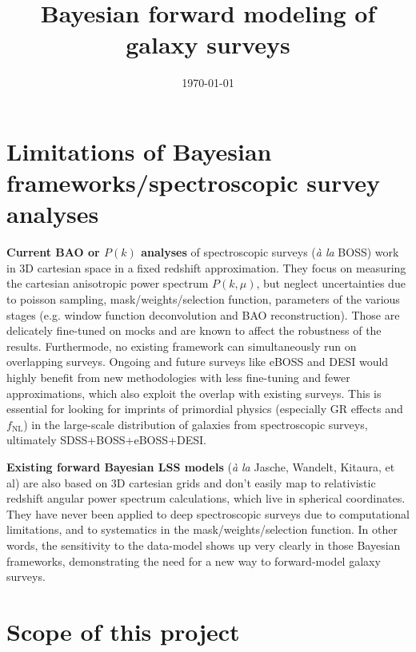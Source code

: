 \documentclass{aastex6}
\begin{document}
 
\title{Bayesian forward modeling of galaxy surveys} 
\author{}
\date{\today}
\maketitle

\vspace*{-1cm}
\section{Limitations of  Bayesian frameworks/spectroscopic survey analyses}
 
\textbf{Current BAO or $P(k)$ analyses} of spectroscopic surveys (\textit{\`a la} BOSS) work in 3D cartesian space in a fixed redshift approximation. 
They focus on measuring the cartesian anisotropic power spectrum $P(k, \mu)$, but neglect uncertainties due to poisson sampling, mask/weights/selection function, parameters of the various stages (e.g. window function deconvolution and BAO reconstruction). 
Those are delicately fine-tuned on mocks and are known to affect the robustness of the results. 
Furthermode, no existing framework can simultaneously run on overlapping surveys. 
Ongoing and future surveys like eBOSS and DESI would highly benefit from new methodologies with less fine-tuning and fewer approximations, which also exploit the overlap with existing surveys. 
This is essential for looking for imprints of primordial physics (especially GR effects and $f_{\mathrm{NL}}$) in the large-scale distribution of galaxies from spectroscopic surveys, ultimately SDSS+BOSS+eBOSS+DESI.

\textbf{Existing forward Bayesian LSS models} (\textit{\`a la} Jasche, Wandelt, Kitaura, et al) are also based on 3D cartesian grids and don't easily map to relativistic redshift angular power spectrum calculations, which live in spherical coordinates. 
They have never been applied to deep spectroscopic surveys due to computational limitations, and to systematics in the mask/weights/selection function.
In other words, the sensitivity to the data-model shows up very clearly in those Bayesian frameworks, demonstrating the need for a new way to forward-model galaxy surveys.


\section{Scope of this project}
\end{document}
